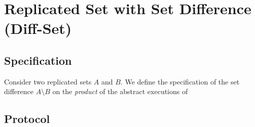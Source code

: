 
\section{Replicated Set with Set Difference (Diff-Set)}

\subsection{Specification}	\label{ss:diff-set-spec}

Consider two replicated sets $A$ and $B$.
We define the specification of the set difference $A \setminus B$ on
the \emph{product} of the abstract executions of 

\subsection{Protocol}		\label{ss:diff-set-protocol}
